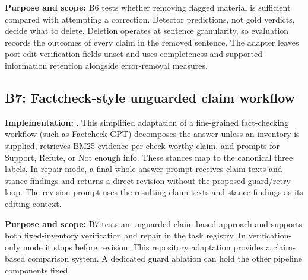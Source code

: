 \documentclass[11pt,a4paper]{article}
\newcommand{\code}[1]{\texttt{\detokenize{#1}}}
\begin{document}
\textbf{Purpose and scope:} B6 tests whether removing flagged material is sufficient compared with attempting a correction. Detector predictions, not gold verdicts, decide what to delete. Deletion operates at sentence granularity, so evaluation records the outcomes of every claim in the removed sentence. The adapter leaves post-edit verification fields unset and uses completeness and supported-information retention alongside error-removal measures.

\subsection{B7: Factcheck-style unguarded claim workflow}
\textbf{Implementation:} \code{b7_factcheck_gpt.py}. This simplified adaptation of a fine-grained fact-checking workflow (such as Factcheck-GPT) decomposes the answer unless an inventory is supplied, retrieves BM25 evidence per check-worthy claim, and prompts for Support, Refute, or Not enough info. These stances map to the canonical three labels. In repair mode, a final whole-answer prompt receives claim texts and stance findings and returns a direct revision without the proposed guard/retry loop. The revision prompt uses the resulting claim texts and stance findings as its editing context.

\textbf{Purpose and scope:} B7 tests an unguarded claim-based approach and supports both fixed-inventory verification and repair in the task registry. In verification-only mode it stops before revision. This repository adaptation provides a claim-based comparison system. A dedicated guard ablation can hold the other pipeline components fixed.
\end{document}
